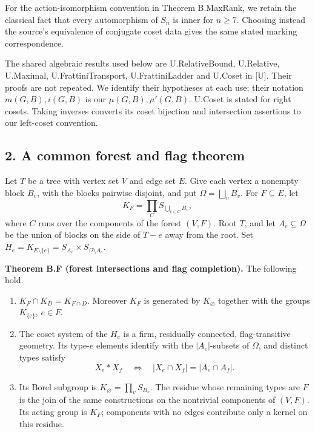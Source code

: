 \documentclass[
  11pt,
  a4paper,
]{article}
\providecommand{\tightlist}{%
  \setlength{\itemsep}{0pt}\setlength{\parskip}{0pt}}
\begin{document}
For the action-isomorphism convention in Theorem B.MaxRank, we retain
the classical fact that every automorphism of \(S_n\) is inner for
\(n\geq7\). Choosing instead the source's equivalence of conjugate coset
data gives the same stated marking correspondence.

The shared algebraic results used below are U.RelativeBound, U.Relative,
U.Maximal, U.FrattiniTransport, U.FrattiniLadder and U.Coset in {[}U{]}.
Their proofs are not repeated. We identify their hypotheses at each use;
their notation \(m(G,B),i(G,B)\) is our \(\mu(G,B),\mu'(G,B)\). U.Coset
is stated for right cosets. Taking inverses converts its coset bijection
and intersection assertions to our left-coset convention.

\subsection{2. A common forest and flag
theorem}\label{a-common-forest-and-flag-theorem}

Let \(T\) be a tree with vertex set \(V\) and edge set \(E\). Give each
vertex a nonempty block \(B_v\), with the blocks pairwise disjoint, and
put \(\Omega=\bigsqcup_vB_v\). For \(F\subseteq E\), let \[
K_F=\prod_C S_{\bigcup_{v\in C}B_v},
\tag{2.1}
\] where \(C\) runs over the components of the forest \((V,F)\). Root
\(T\), and let \(A_e\subseteq\Omega\) be the union of blocks on the side
of \(T-e\) away from the root. Set
\(H_e=K_{E\setminus\{e\}}=S_{A_e}\times S_{\Omega\setminus A_e}\).

\textbf{Theorem B.F (forest intersections and flag completion).} The
following hold.

\begin{enumerate}
\def\labelenumi{\arabic{enumi}.}
\tightlist
\item
  \(K_F\cap K_D=K_{F\cap D}\). Moreover \(K_F\) is generated by
  \(K_\varnothing\) together with the groups \(K_{\{e\}}\), \(e\in F\).
\item
  The coset system of the \(H_e\) is a firm, residually connected,
  flag-transitive geometry. Its type-\(e\) elements identify with the
  \(|A_e|\)-subsets of \(\Omega\), and distinct types satisfy \[
  X_e\mathrel{*}X_f\quad\Longleftrightarrow\quad
  |X_e\cap X_f|=|A_e\cap A_f|.
  \tag{2.2}
  \]
\item
  Its Borel subgroup is \(K_\varnothing=\prod_vS_{B_v}\). The residue
  whose remaining types are \(F\) is the join of the same constructions
  on the nontrivial components of \((V,F)\). Its acting group is
  \(K_F\); components with no edges contribute only a kernel on this
  residue.
\end{enumerate}
\end{document}
